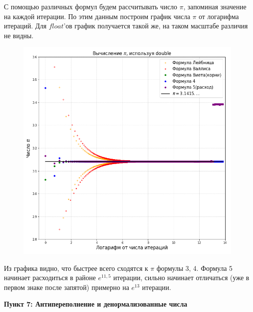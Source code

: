 \documentclass[a4paper,12pt]{article}
\begin{document}
С помощью различных формул будем рассчитывать число $\pi$, запоминая значение на каждой итерации. По этим данным построим график числа $\pi$ от логарифма итераций. Для $float$'ов график получается такой же, на таком масштабе различия не видны.
\begin{figure}[H]\label{fig: Pi_double}
    \centering
    \includegraphics[width = \textwidth]{Pi_double.png}
\end{figure}
Из графика видно, что быстрее всего сходятся к $\pi$ формулы 3, 4. Формула 5 начинает расходиться в районе $e^{11,5}$ итерации, сильно начинает отличаться (уже в первом знаке после запятой) примерно на $e^{13}$ итерации.
\newpage 

\textbf{Пункт 7: Антипереполнение и денормализованные числа}
\end{document}
